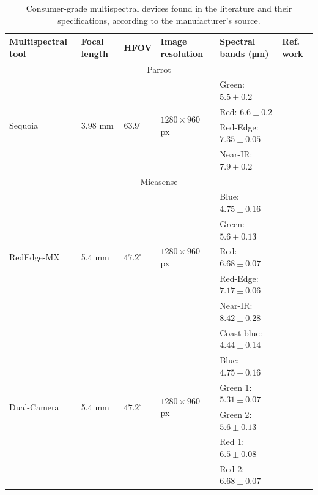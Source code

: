 \renewcommand{\arraystretch}{1.2}
\begin{table}[htb]
    \caption{Consumer-grade multispectral devices found in the literature and their specifications, according to the manufacturer's source.}
    \label{table:multispectral_devices}
    \begin{tabular}{llllll}
        \toprule
        Multispectral tool & Focal length & HFOV & Image resolution & Spectral bands (\si{\micro\meter}) & Ref. work \\
        \midrule
        \multicolumn{6}{c}{Parrot}\\
        \cmidrule{1-6}
        \multirow{4}{*}{Sequoia}     & \multirow{4}{*}{3.98 \si{\milli\meter}}   & \multirow{4}{*}{$63.9^{\circ}$}  & \multirow{4}{*}{$1280 \times 960$ px}  & Green: $5.5 \pm 0.2$  & \multirow{4}{*}{\cite{franzini_geometric_2019}}\\
        & & & & Red: $6.6 \pm 0.2$ &\\
        & & & & Red-Edge: $7.35 \pm 0.05$ &\\
        & & & & Near-IR: $7.9 \pm 0.2$ &\\
        \cmidrule{1-6}
        \multicolumn{6}{c}{Micasense}\\
        \cmidrule{1-6}
        \multirow{5}{*}{RedEdge-MX}     & \multirow{5}{*}{5.4 \si{\milli\meter}}   & \multirow{5}{*}{$47.2^{\circ}$}  & \multirow{5}{*}{$1280 \times 960$ px}  & Blue: $4.75 \pm 0.16$     & \multirow{5}{*}{\cite{cunha_prediction_2021, isgro_unmanned_2021}}\\
        & & & & Green: $5.6 \pm 0.13$ &\\
        & & & & Red: $6.68 \pm 0.07$ &\\
        & & & & Red-Edge: $7.17 \pm 0.06$ &\\
        & & & & Near-IR: $8.42 \pm 0.28$ &\\
        \cmidrule{1-6}
        \multirow{10}{*}{Dual-Camera}     & \multirow{10}{*}{5.4 \si{\milli\meter}}   & \multirow{10}{*}{$47.2^{\circ}$}  & \multirow{10}{*}{$1280 \times 960$ px} & Coast blue: $4.44 \pm 0.14$    & \multirow{10}{*}{\cite{chakhvashvili_comparison_2021}}\\
        & & & & Blue: $4.75 \pm 0.16$ &\\
        & & & & Green 1: $5.31 \pm 0.07$ &\\
        & & & & Green 2: $5.6 \pm 0.13$ &\\
        & & & & Red 1: $6.5 \pm 0.08$ &\\
        & & & & Red 2: $6.68 \pm 0.07$ &\\

\end{tabular}
\end{table}
